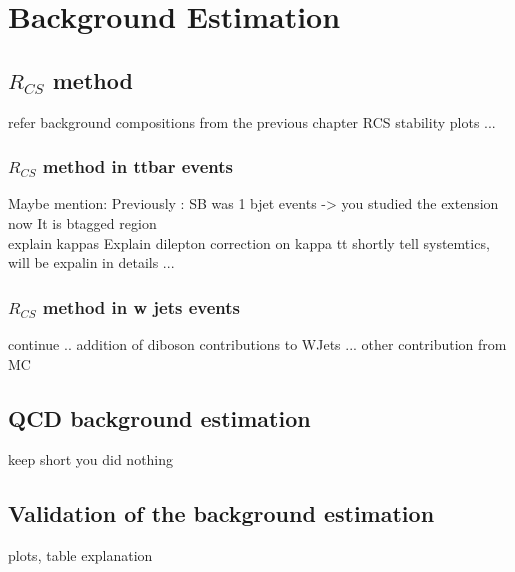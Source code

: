 \chapter{Background Estimation}
\section{$R_{CS}$ method}
refer background compositions from the previous chapter 
\newpage
RCS stability plots ...
\newpage
\subsection{$R_{CS}$ method in ttbar events}
\newpage
Maybe mention: Previously : SB was 1 bjet events -> you studied the extension now It is btagged region \\
\newpage
explain kappas 
\newpage
Explain dilepton correction on kappa tt
\newpage
shortly tell systemtics, will be expalin in details ... 
\newpage
\subsection{$R_{CS}$ method in w jets events}
\newpage
continue ..
\newpage
addition of diboson contributions to WJets ...
\newpage
other contribution from MC
\newpage
\section{QCD background estimation}
keep short you did nothing 
\newpage
\section{Validation of the background estimation}
plots, table
\newpage
explanation

